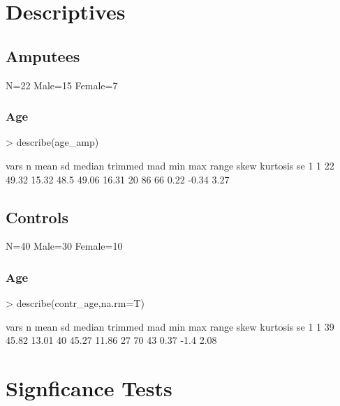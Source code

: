 \documentclass{article}
\begin{document}


\section*{Descriptives}
\subsection*{Amputees}
N=22
Male=15
Female=7
\subsubsection*{Age}
\begin{Schunk}
\begin{Sinput}
> describe(age_amp)
\end{Sinput}
\begin{Soutput}
  vars  n  mean    sd median trimmed   mad min max range skew kurtosis   se
1    1 22 49.32 15.32   48.5   49.06 16.31  20  86    66 0.22    -0.34 3.27
\end{Soutput}
\end{Schunk}
\subsection*{Controls}
N=40
Male=30
Female=10
\subsubsection*{Age}
\begin{Schunk}
\begin{Sinput}
> describe(contr_age,na.rm=T)
\end{Sinput}
\begin{Soutput}
  vars  n  mean    sd median trimmed   mad min max range skew kurtosis   se
1    1 39 45.82 13.01     40   45.27 11.86  27  70    43 0.37     -1.4 2.08
\end{Soutput}
\end{Schunk}

\section*{Signficance Tests}
\end{document}
